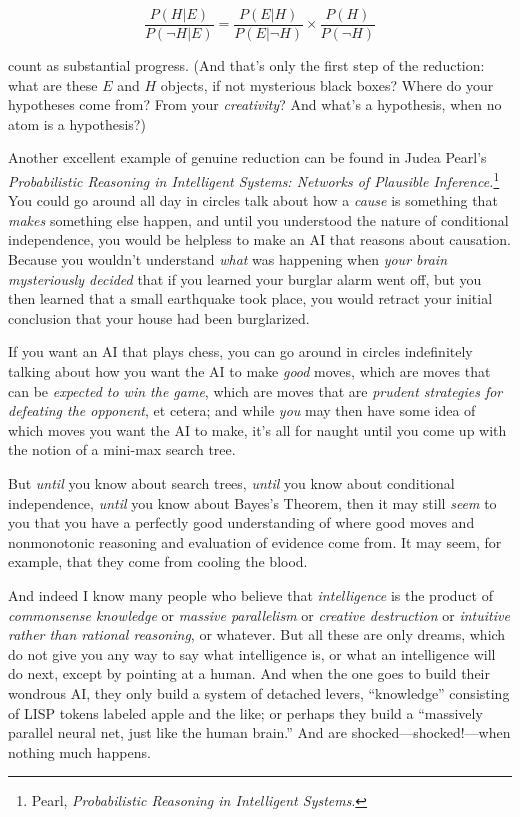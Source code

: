 \begin{equation*}
  \frac{P(H|E)}{P(\lnot H|E)} = \frac{P(E|H)}{P(E|\lnot H)} \times
  \frac{P(H)}{P(\lnot H)}
\end{equation*}


{
 count as substantial progress. (And that's only
the first step of the reduction: what are these $E$ and $H$ objects, if not
mysterious black boxes? Where do your hypotheses come from? From your
\textit{creativity}? And what's a hypothesis, when no
atom is a hypothesis?) }

{
 Another excellent example of genuine reduction can be found in
Judea Pearl's \textit{Probabilistic Reasoning in
Intelligent Systems: Networks of Plausible
Inference.}\footnote{Pearl, \textit{Probabilistic Reasoning in Intelligent
Systems}.} You could go around all day in circles
talk about how a \textit{cause} is something that \textit{makes}
something else happen, and until you understood the nature of
conditional independence, you would be helpless to make an AI that
reasons about causation. Because you wouldn't
understand \textit{what} was happening when \textit{your brain
mysteriously decided} that if you learned your burglar alarm went off,
but you then learned that a small earthquake took place, you would
retract your initial conclusion that your house had been burglarized.}

{
 If you want an AI that plays chess, you can go around in circles
indefinitely talking about how you want the AI to make \textit{good}
moves, which are moves that can be \textit{expected to win the game},
which are moves that are \textit{prudent strategies for defeating the
opponent}, et cetera; and while \textit{you} may then have some idea of
which moves you want the AI to make, it's all for
naught until you come up with the notion of a mini-max search tree.}

{
 But \textit{until} you know about search trees, \textit{until} you
know about conditional independence, \textit{until} you know about
Bayes's Theorem, then it may still \textit{seem} to you
that you have a perfectly good understanding of where good moves and
nonmonotonic reasoning and evaluation of evidence come from. It may
seem, for example, that they come from cooling the blood.}

{
 And indeed I know many people who believe that
\textit{intelligence} is the product of \textit{commonsense knowledge}
or \textit{massive parallelism} or \textit{creative destruction} or
\textit{intuitive rather than rational reasoning}, or whatever. But all
these are only dreams, which do not give you any way to say what
intelligence is, or what an intelligence will do next, except by
pointing at a human. And when the one goes to build their wondrous AI,
they only build a system of detached levers,
``knowledge'' consisting of LISP
tokens labeled apple and the like; or perhaps they build a
``massively parallel neural net, just like the human
brain.'' And are shocked---shocked!---when nothing
much happens.}

